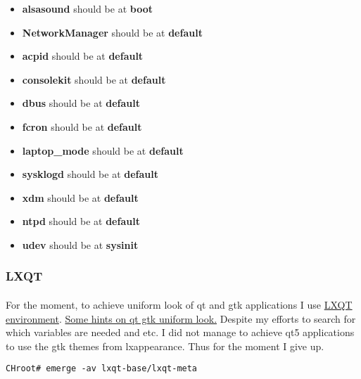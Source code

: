 \documentclass[10pt,a4paper]{article}
\begin{document}
                    \begin{itemize}
                        \item \textbf{alsasound} should be at \textbf{boot}
                        \item \textbf{NetworkManager} should be at \textbf{default}
                        \item \textbf{acpid} should be at \textbf{default}
                        \item \textbf{consolekit} should be at \textbf{default}
                        \item \textbf{dbus} should be at \textbf{default}
                        \item \textbf{fcron} should be at \textbf{default}
                        \item \textbf{laptop\_mode} should be at \textbf{default}
                        \item \textbf{sysklogd} should be at \textbf{default}
                        \item \textbf{xdm} should be at \textbf{default}
                        \item \textbf{ntpd} should be at \textbf{default}
                        \item \textbf{udev} should be at \textbf{sysinit}
                    \end{itemize}
                
                \newpage
                \subsubsection{LXQT}
                
                    \paragraph{} For the moment, to achieve uniform look of qt and gtk applications I use \href{https://wiki.gentoo.org/wiki/LXQt}{LXQT environment}. \href{https://wiki.archlinux.org/index.php/GTK\%2B#GTK.2B_and_Qt}{Some hints on qt gtk uniform look.} Despite my efforts to search for which variables are needed and etc. I did not manage to achieve qt5 applications to use the gtk themes from lxappearance. Thus for the moment I give up.
                    
                    \begin{lstlisting}[style=BashInputCHRoot]
 CHroot# emerge -av lxqt-base/lxqt-meta
                    \end{lstlisting}
                    
\end{document}

